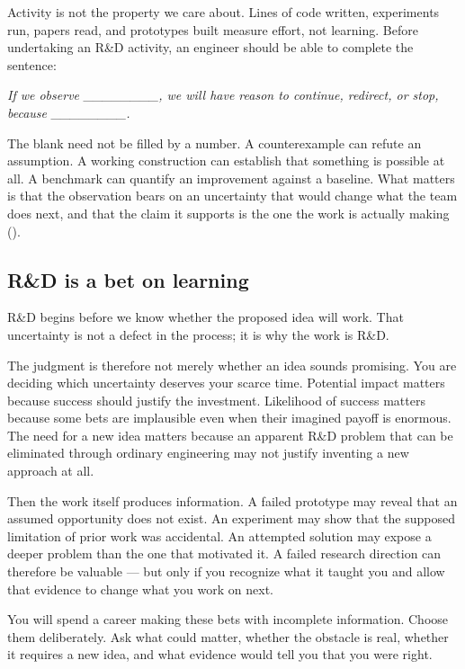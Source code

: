 Activity is not the property we care about. Lines of code written, experiments run, papers read, and
prototypes built measure effort, not learning. Before undertaking an R\&D activity, an engineer
should be able to complete the sentence:

\emph{If we observe \_\_\_\_\_\_\_\_, we will have reason to continue, redirect, or stop, because \_\_\_\_\_\_\_\_.}

The blank need not be filled by a number. A counterexample can refute an assumption. A working
construction can establish that something is possible at all. A benchmark can quantify an
improvement against a baseline. What matters is that the observation bears on an uncertainty that
would change what the team does next, and that the claim it supports is the one the work is actually
making (\citet{sec-establish}).

\subsection{R\&D is a bet on learning}\label{sec-bet-on-learning}

R\&D begins before we know whether the proposed idea will work. That uncertainty is not a defect in
the process; it is why the work is R\&D.

The judgment is therefore not merely whether an idea sounds promising. You are deciding which
uncertainty deserves your scarce time. Potential impact matters because success should justify the
investment. Likelihood of success matters because some bets are implausible even when their
imagined payoff is enormous. The need for a new idea matters because an apparent R\&D problem that
can be eliminated through ordinary engineering may not justify inventing a new approach at all.

Then the work itself produces information. A failed prototype may reveal that an assumed
opportunity does not exist. An experiment may show that the supposed limitation of prior work was
accidental. An attempted solution may expose a deeper problem than the one that motivated it. A
failed research direction can therefore be valuable --- but only if you recognize what it taught you
and allow that evidence to change what you work on next.

You will spend a career making these bets with incomplete information. Choose them deliberately.
Ask what could matter, whether the obstacle is real, whether it requires a new idea, and what
evidence would tell you that you were right.

